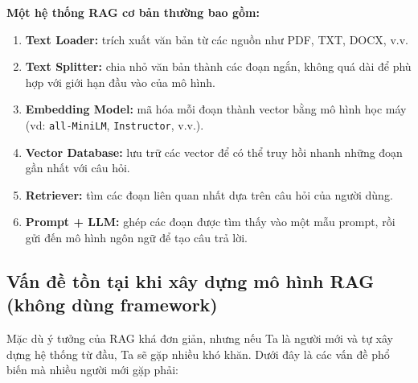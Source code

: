 \documentclass[11pt]{article}
\begin{document}
\textbf{Một hệ thống RAG cơ bản thường bao gồm:}
\begin{enumerate}
    \item \textbf{Text Loader:} trích xuất văn bản từ các nguồn như PDF, TXT, DOCX, v.v.
    \item \textbf{Text Splitter:} chia nhỏ văn bản thành các đoạn ngắn, không quá dài để phù hợp với giới hạn đầu vào của mô hình.
    \item \textbf{Embedding Model:} mã hóa mỗi đoạn thành vector bằng mô hình học máy (vd: \texttt{all-MiniLM}, \texttt{Instructor}, v.v.).
    \item \textbf{Vector Database:} lưu trữ các vector để có thể truy hồi nhanh những đoạn gần nhất với câu hỏi.
    \item \textbf{Retriever:} tìm các đoạn liên quan nhất dựa trên câu hỏi của người dùng.
    \item \textbf{Prompt + LLM:} ghép các đoạn được tìm thấy vào một mẫu prompt, rồi gửi đến mô hình ngôn ngữ để tạo câu trả lời.
\end{enumerate}

\vspace{1em}

\subsection{Vấn đề tồn tại khi xây dựng mô hình RAG (không dùng framework)}

Mặc dù ý tưởng của RAG khá đơn giản, nhưng nếu Ta là người mới và tự xây dựng hệ thống từ đầu, Ta sẽ gặp nhiều khó khăn. Dưới đây là các vấn đề phổ biến mà nhiều người mới gặp phải:
\end{document}
